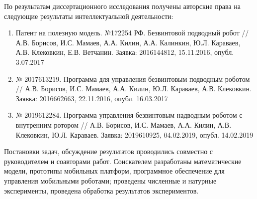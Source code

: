 По результатам диссертационного исследования получены авторские права на следующие результаты интеллектуальной деятельности:
\begin{enumerate}
	
	\item Патент на полезную модель. №172254 РФ. Безвинтовой подводный робот //  А.В. Борисов, И.С. Мамаев, А.А. Килин, А.А. Калинкин, Ю.Л. Караваев, А.В. Клековкин, Е.В. Ветчанин. Заявка: 2016144812, 15.11.2016, опубл. 3.07.2017
	
	\item № 2017613219. Программа для управления безвинтовым подводным роботом // А.В. Борисов, И.С. Мамаев, А.А. Килин, Ю.Л. Караваев, А.В. Клековкин. Заявка: 2016662663, 22.11.2016, опубл. 16.03.2017
	
	\item № 2019612284. Программа управления безвинтовым надводным роботом с внутренним ротором // А.В. Борисов, И.С. Мамаев, А.А. Килин, А.В. Клековкин, Ю.Л. Караваев. Заявка: 2019610925, 04.02.2019, опубл. 14.02.2019
	
\end{enumerate}

{\contribution} Постановки задач, обсуждение результатов проводились совместно с руководителем и соавторами работ. Соискателем разработаны математические модели, прототипы мобильных платформ, программное обеспечение для управления мобильными роботами; проведены численные и натурные эксперименты, проведена обработка результатов экспериментов.

